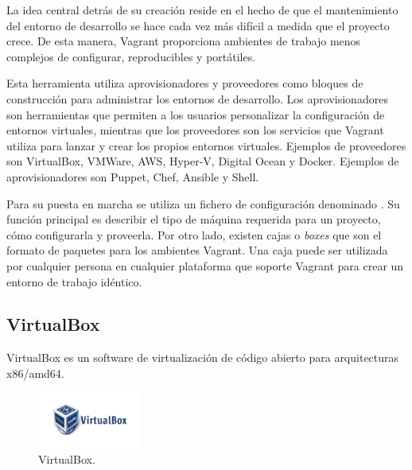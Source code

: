 La idea central detrás de su creación reside en el hecho de que el mantenimiento del entorno de desarrollo se hace cada vez más difícil a medida que el proyecto crece. De esta manera, Vagrant proporciona ambientes de trabajo menos complejos de configurar, reproducibles y portátiles.

Esta herramienta utiliza aprovisionadores y proveedores como bloques de construcción para administrar los entornos de desarrollo. Los aprovisionadores son herramientas que permiten a los usuarios personalizar la configuración de entornos virtuales, mientras que los proveedores son los servicios que Vagrant utiliza para lanzar y crear los propios entornos virtuales. Ejemplos de proveedores son VirtualBox, VMWare, AWS, Hyper-V, Digital Ocean y Docker. Ejemplos de aprovisionadores son Puppet, Chef, Ansible y Shell.

Para su puesta en marcha se utiliza un fichero de configuración denominado . Su función principal es describir el tipo de máquina requerida para un proyecto, cómo configurarla y proveerla. Por otro lado, existen cajas o \textit{boxes} que son el formato de paquetes para los ambientes Vagrant. Una caja puede ser utilizada por cualquier persona en cualquier plataforma que soporte Vagrant para crear un entorno de trabajo idéntico.

\subsection{VirtualBox}

VirtualBox es un software de virtualización de código abierto para arquitecturas x86/amd64. 

\begin{figure}[H]
\centering
\includegraphics[width=0.3\textwidth]{images/figures/virtualbox.png}
\caption{VirtualBox.\label{fig:figure_placement_example}}
\end{figure}

